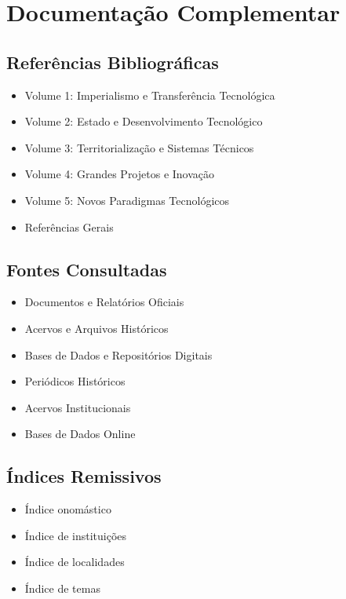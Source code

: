 \documentclass[12pt,a4paper]{report}
\begin{document}
\chapter{Documentação Complementar}

\section{Referências Bibliográficas}
\begin{itemize}[leftmargin=*]
    \item Volume 1: Imperialismo e Transferência Tecnológica
    \item Volume 2: Estado e Desenvolvimento Tecnológico
    \item Volume 3: Territorialização e Sistemas Técnicos
    \item Volume 4: Grandes Projetos e Inovação
    \item Volume 5: Novos Paradigmas Tecnológicos
    \item Referências Gerais
\end{itemize}

\section{Fontes Consultadas}
\begin{itemize}[leftmargin=*]
    \item Documentos e Relatórios Oficiais
    \item Acervos e Arquivos Históricos
    \item Bases de Dados e Repositórios Digitais
    \item Periódicos Históricos
    \item Acervos Institucionais
    \item Bases de Dados Online
\end{itemize}

\section{Índices Remissivos}
\begin{itemize}[leftmargin=*]
    \item Índice onomástico
    \item Índice de instituições
    \item Índice de localidades
    \item Índice de temas
\end{itemize}
\end{document}
